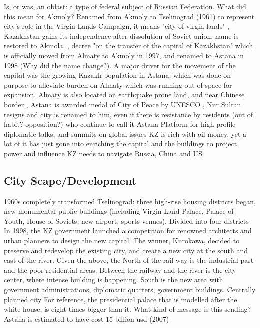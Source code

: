 \documentclass{article}
\begin{document}
\begin{outline}
  \1 Is, or was, an oblast: a type of federal subject of Russian Federation. What did this mean for Akmoly? 
  \1 Renamed from Akmoly to Tselinograd (1961) to represent city's role in the Virgin Lands Campaign, it means "city of virgin lands"
  , Kazakhstan gains its independence after dissolution of Soviet union, name is restored to Akmola.
  , decree "on the transfer of the capital of Kazakhstan" which is officially moved from Almaty to Akmoly in 1997, and renamed to Astana in 1998 (Why did the name change?). A major driver for the movement of the capital was the growing Kazakh population in Astana, which was done on purpose to alleviate burden on Almaty which was running out of space for expansion. Almaty is also located on earthquake prone land, and near Chinese border
  , Astana is awarded medal of City of Peace by UNESCO
  , Nur Sultan resigns and city is renamed to him, even if there is resistance by residents (out of habit? opposition?) who continue to call it Astana
  \1 Platform for high profile diplomatic talks, and summits on global issues
  \1 KZ is rich with oil money, yet a lot of it has just gone into enriching the capital and the buildings to project power and influence
  \1 KZ needs to navigate Russia, China and US 
\end{outline}


\subsection{City Scape/Development}

\begin{outline}
  \1 1960s completely transformed Tselinograd: three high-rise housing districts began, new monumental public buildings (including Virgin Land Palace, Palace of Youth, House of Soviets, new airport, sports venues).
  \1 Divided into four districts
  \1 In 1998, the KZ government launched a competition for renowned architects and urban planners to design the new capital. The winner, Kurokawa, decided to preserve and redevelop the existing city, and create a new city at the south and east of the river. 
  \1 Given the above, the North of the rail way is the industrial part and the poor residential areas. Between the railway and the river is the city center, where intense building is happening. South is the new area with government administrations, diplomatic quarters, government buildings.
  \1 Centrally planned city
  \1 For reference, the presidential palace that is modelled after the white house, is eight times bigger than it. What kind of message is this sending? 
  \1 Astana is estimated to have cost 15 billion usd (2007) \cite{laszczkowski2011building}
\end{outline}
\end{document}
